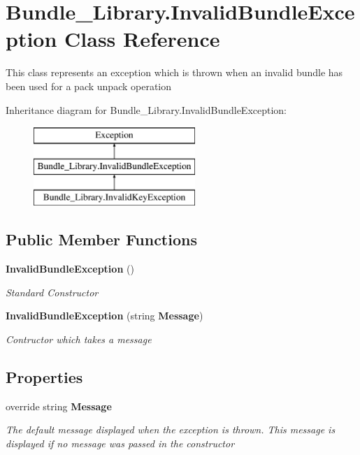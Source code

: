 \section{Bundle\+\_\+\+Library.\+Invalid\+Bundle\+Exception Class Reference}
\label{class_bundle___library_1_1_invalid_bundle_exception}


This class represents an exception which is thrown when an invalid bundle has been used for a pack unpack operation  


Inheritance diagram for Bundle\+\_\+\+Library.\+Invalid\+Bundle\+Exception\+:\begin{figure}[H]
\begin{center}
\leavevmode
\includegraphics[height=3.000000cm]{class_bundle___library_1_1_invalid_bundle_exception}
\end{center}
\end{figure}
\subsection*{Public Member Functions}
\begin{DoxyCompactItemize}
\item 
{\bf Invalid\+Bundle\+Exception} ()
\begin{DoxyCompactList}\small\item\em Standard Constructor \end{DoxyCompactList}\item 
{\bf Invalid\+Bundle\+Exception} (string {\bf Message})
\begin{DoxyCompactList}\small\item\em Contructor which takes a message \end{DoxyCompactList}\end{DoxyCompactItemize}
\subsection*{Properties}
\begin{DoxyCompactItemize}
\item 
override string {\bf Message}\hspace{0.3cm}{\ttfamily  [get]}
\begin{DoxyCompactList}\small\item\em The default message displayed when the exception is thrown. This message is displayed if no message was passed in the constructor \end{DoxyCompactList}\end{DoxyCompactItemize}


